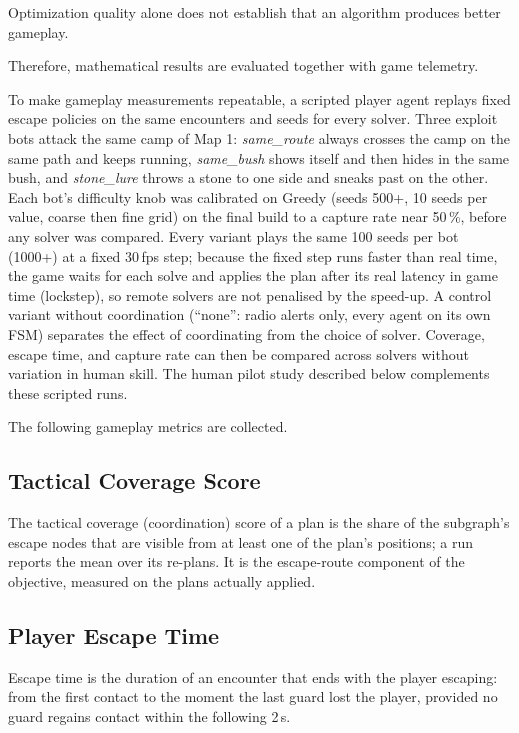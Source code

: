 \documentclass[12pt, a4paper]{article}
\begin{document}
Optimization quality alone does not establish that an algorithm produces better gameplay.

Therefore, mathematical results are evaluated together with game telemetry.

To make gameplay measurements repeatable, a scripted player agent replays fixed escape policies on the same encounters and seeds for every solver. Three exploit bots attack the same camp of Map 1: \textit{same\_route} always crosses the camp on the same path and keeps running, \textit{same\_bush} shows itself and then hides in the same bush, and \textit{stone\_lure} throws a stone to one side and sneaks past on the other. Each bot's difficulty knob was calibrated on Greedy (seeds 500+, 10 seeds per value, coarse then fine grid) on the final build to a capture rate near 50\,\%, before any solver was compared. Every variant plays the same 100 seeds per bot (1000+) at a fixed 30\,fps step; because the fixed step runs faster than real time, the game waits for each solve and applies the plan after its real latency in game time (lockstep), so remote solvers are not penalised by the speed-up. A control variant without coordination (``none'': radio alerts only, every agent on its own FSM) separates the effect of coordinating from the choice of solver. Coverage, escape time, and capture rate can then be compared across solvers without variation in human skill. The human pilot study described below complements these scripted runs.

The following gameplay metrics are collected.

\subsection*{Tactical Coverage Score}

The tactical coverage (coordination) score of a plan is the share of the subgraph's escape nodes that are visible from at least one of the plan's positions; a run reports the mean over its re-plans. It is the escape-route component of the objective, measured on the plans actually applied.

\subsection*{Player Escape Time}

Escape time is the duration of an encounter that ends with the player escaping: from the first contact to the moment the last guard lost the player, provided no guard regains contact within the following 2\,s.
\end{document}
